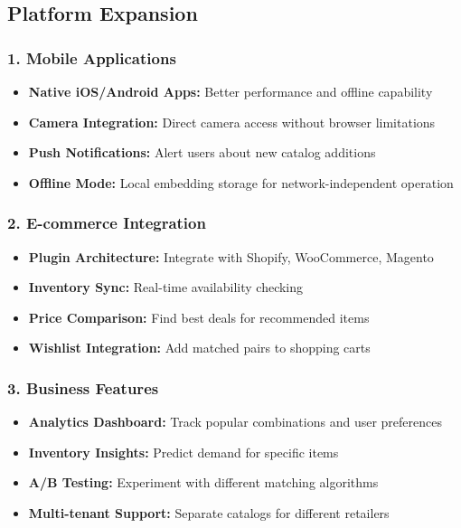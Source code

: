 \documentclass[12pt,a4paper]{report}
\begin{document}
\subsection{Platform Expansion}

\subsubsection{1. Mobile Applications}
\begin{itemize}
    \item \textbf{Native iOS/Android Apps:} Better performance and offline capability
    \item \textbf{Camera Integration:} Direct camera access without browser limitations
    \item \textbf{Push Notifications:} Alert users about new catalog additions
    \item \textbf{Offline Mode:} Local embedding storage for network-independent operation
\end{itemize}

\subsubsection{2. E-commerce Integration}
\begin{itemize}
    \item \textbf{Plugin Architecture:} Integrate with Shopify, WooCommerce, Magento
    \item \textbf{Inventory Sync:} Real-time availability checking
    \item \textbf{Price Comparison:} Find best deals for recommended items
    \item \textbf{Wishlist Integration:} Add matched pairs to shopping carts
\end{itemize}

\subsubsection{3. Business Features}
\begin{itemize}
    \item \textbf{Analytics Dashboard:} Track popular combinations and user preferences
    \item \textbf{Inventory Insights:} Predict demand for specific items
    \item \textbf{A/B Testing:} Experiment with different matching algorithms
    \item \textbf{Multi-tenant Support:} Separate catalogs for different retailers
\end{itemize}
\end{document}
